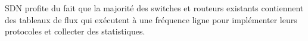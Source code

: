 SDN profite du fait que la majorité des switches et routeurs existants contiennent des tableaux de flux qui exécutent à une fréquence ligne pour implémenter leurs protocoles et collecter des statistiques.




